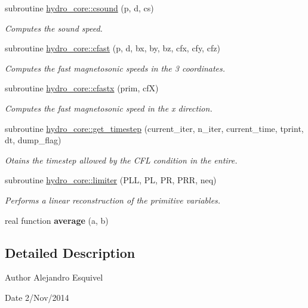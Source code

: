 \begin{DoxyCompactItemize}
subroutine \hyperlink{namespacehydro__core_a27cb7ddb40cc0226e0139bd9eba42dfa}{hydro\+\_\+core\+::csound} (p, d, cs)
\begin{DoxyCompactList}\small\item\em Computes the sound speed. \end{DoxyCompactList}\item 
subroutine \hyperlink{namespacehydro__core_ab2655b81626d4d95cb003112248e928a}{hydro\+\_\+core\+::cfast} (p, d, bx, by, bz, cfx, cfy, cfz)
\begin{DoxyCompactList}\small\item\em Computes the fast magnetosonic speeds in the 3 coordinates. \end{DoxyCompactList}\item 
subroutine \hyperlink{namespacehydro__core_abd089f71325e32997703c1420db62aa8}{hydro\+\_\+core\+::cfastx} (prim, cf\+X)
\begin{DoxyCompactList}\small\item\em Computes the fast magnetosonic speed in the x direction. \end{DoxyCompactList}\item 
subroutine \hyperlink{namespacehydro__core_a89c51c2e68906bd5c2a1487283e10181}{hydro\+\_\+core\+::get\+\_\+timestep} (current\+\_\+iter, n\+\_\+iter, current\+\_\+time, tprint, dt, dump\+\_\+flag)
\begin{DoxyCompactList}\small\item\em Otains the timestep allowed by the C\+F\+L condition in the entire. \end{DoxyCompactList}\item 
subroutine \hyperlink{namespacehydro__core_ada63ca89d1a40cfd1a62db0ddfdbda80}{hydro\+\_\+core\+::limiter} (P\+L\+L, P\+L, P\+R, P\+R\+R, neq)
\begin{DoxyCompactList}\small\item\em Performs a linear reconstruction of the primitive variables. \end{DoxyCompactList}\item 
\hypertarget{hydro__core_8f90_a6d27fe4138b4de2f5bb7448e9eafc4ee}{}real function {\bfseries average} (a, b)\label{hydro__core_8f90_a6d27fe4138b4de2f5bb7448e9eafc4ee}

\end{DoxyCompactItemize}


\subsection{Detailed Description}
\begin{DoxyAuthor}{Author}
Alejandro Esquivel 
\end{DoxyAuthor}
\begin{DoxyDate}{Date}
2/\+Nov/2014 
\end{DoxyDate}
